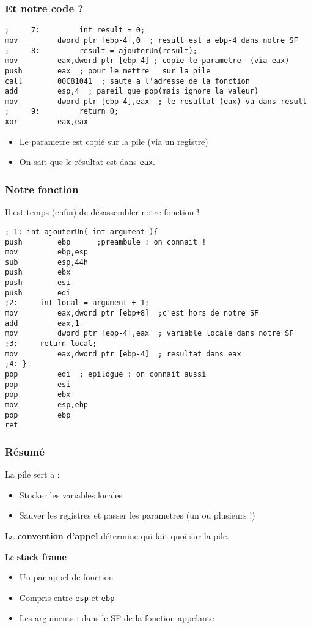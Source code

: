\documentclass{beamer}
\begin{document}
\begin{frame}[fragile]
\frametitle{Et notre code ?}
\begin{lstlisting}[language={[x86masm]Assembler}, basicstyle={\scriptsize\ttfamily}]
;     7:         int result = 0;
mov         dword ptr [ebp-4],0  ; result est a ebp-4 dans notre SF 
;     8:         result = ajouterUn(result);
mov         eax,dword ptr [ebp-4] ; copie le parametre  (via eax)
push        eax  ; pour le mettre 	sur la pile 
call        00C81041  ; saute a l'adresse de la fonction
add         esp,4  ; pareil que pop(mais ignore la valeur)
mov         dword ptr [ebp-4],eax  ; le resultat (eax) va dans result
;     9:         return 0;
xor         eax,eax  
\end{lstlisting}
\begin{itemize}
\item Le parametre est copié sur la pile (via un registre)
\item On sait que le résultat est dans \texttt{eax}.
\end{itemize}
\end{frame}

\begin{frame}[fragile]
\frametitle{Notre fonction}
Il est temps (enfin) de désassembler notre fonction !
\begin{lstlisting}[language={[x86masm]Assembler}, basicstyle={\scriptsize\ttfamily}]
; 1: int ajouterUn( int argument ){
push        ebp      ;preambule : on connait !
mov         ebp,esp  
sub         esp,44h  
push        ebx  
push        esi  
push        edi  
;2: 	int local = argument + 1;
mov         eax,dword ptr [ebp+8]  ;c'est hors de notre SF
add         eax,1  
mov         dword ptr [ebp-4],eax  ; variable locale dans notre SF
;3: 	return local;
mov         eax,dword ptr [ebp-4]  ; resultat dans eax
;4: }
pop         edi  ; epilogue : on connait aussi
pop         esi  
pop         ebx  
mov         esp,ebp  
pop         ebp  
ret  
\end{lstlisting}

\end{frame}

\begin{frame}[fragile]
\frametitle{Résumé}
La pile sert a :
\begin{itemize}
\item Stocker les variables locales
\item Sauver les registres et passer les parametres (un ou plusieurs !)
\end{itemize}
La \textbf{convention d'appel} détermine qui fait quoi sur la pile.

Le \textbf{stack frame}
\begin{itemize}
\item Un par appel de fonction
\item Compris entre \texttt{esp} et \texttt{ebp}
\item Les arguments : dans le SF de la fonction appelante
\end{itemize}

\end{frame}
\end{document}

